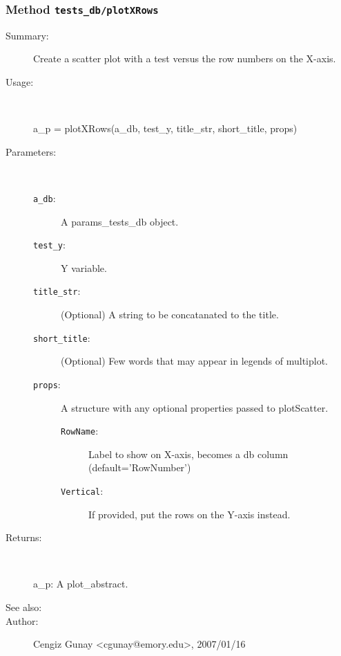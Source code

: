 \subsubsection[Method \texttt{plotXRows}]{Method \texttt{tests\_db/plotXRows}}%
%
\label{ref_tests_db__plotXRows}%
\hypertarget{ref_tests_db__plotXRows}{}%
\begin{description}
\item[Summary:]Create a scatter plot with a test versus the row numbers on the X-axis.
%
\item[Usage:]~%
\begin{lyxcode}%
a\_p = plotXRows(a\_db, test\_y, title\_str, short\_title, props)
%
\end{lyxcode}%
%
%
\item[Parameters:]~
\begin{description}%
\item[\texttt{a\_db}:]
 A params\_tests\_db object.
\item[\texttt{test\_y}:]
 Y variable.
\item[\texttt{title\_str}:]
 (Optional) A string to be concatanated to the title.
\item[\texttt{short\_title}:]
 (Optional) Few words that may appear in legends of multiplot.
\item[\texttt{props}:]
 A structure with any optional properties passed to plotScatter.
\begin{description}%
\item[\texttt{RowName}:]
 Label to show on X-axis, becomes a db column (default='RowNumber')
\item[\texttt{Vertical}:]
 If provided, put the rows on the Y-axis instead.
\end{description}%
\end{description}%
%
\item[Returns:
]~

   a\_p: A plot\_abstract.
%
%
\item[See also:]%
%
\item[Author:]%
Cengiz Gunay <cgunay@emory.edu>, 2007/01/16
%
\end{description}
\methodline%
